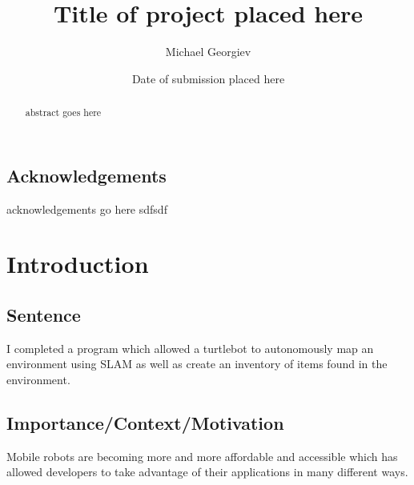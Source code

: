 \documentclass{mproj}
\begin{document}
\title{Title of project placed here}
\author{Michael Georgiev}
\date{Date of submission placed here}
\maketitle

\begin{abstract}
abstract goes here
\end{abstract}

\educationalconsent


\newpage
\section*{Acknowledgements}

acknowledgements go here sdfsdf

\tableofcontents

\chapter{Introduction}\label{intro}

\section{Sentence}

I completed a program which allowed a turtlebot to autonomously map an environment using SLAM as well as create an inventory of items found in the environment.


\section{Importance/Context/Motivation}

Mobile robots are becoming more and more affordable and accessible which has allowed developers to take advantage of their applications in many different ways. 
\end{document}
